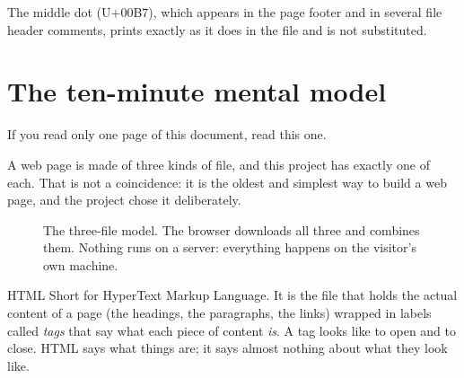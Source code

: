 \documentclass[11pt,a4paper]{article}
\begin{document}
The middle dot (U+00B7), which appears in the page footer and in several file
header comments, prints exactly as it does in the file and is not substituted.

\section{The ten-minute mental model}

If you read only one page of this document, read this one.

A web page is made of three kinds of file, and this project has exactly one of
each. That is not a coincidence: it is the oldest and simplest way to build a
web page, and the project chose it deliberately.

\begin{figure}[H]\centering
{}
\caption{The three-file model. The browser downloads all three and combines them.
Nothing runs on a server: everything happens on the visitor's own machine.}
\end{figure}

\begin{jargon}{HTML}
Short for HyperText Markup Language. It is the file that holds the actual
content of a page (the headings, the paragraphs, the links) wrapped in labels
called \emph{tags} that say what each piece of content \emph{is}. A tag looks
like  to open and  to close. HTML says what things are; it
says almost nothing about what they look like.
\end{jargon}
\end{document}
